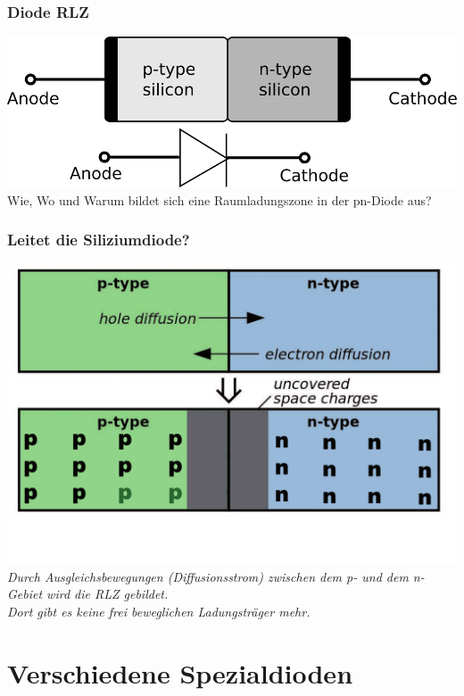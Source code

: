 \begin{frame}
    \frametitle{Diode RLZ}
    \begin{center}
        \includegraphics[width=1\textwidth]{a05/diode_with_electrical_symbol.png}
        \tiny \hyperlink{refs}{\cite{wm}} \\[3em]
     \large Wie, Wo und Warum bildet sich eine Raumladungszone in der pn-Diode aus?
     \end{center}
\end{frame}

\begin{frame}
    \frametitle{Leitet die Siliziumdiode?}
    \begin{center}
        \includegraphics[width=1\textwidth]{a05/Pn_Junction_Diffusion_and_Drift.pdf}\\
     \emph{Durch Ausgleichsbewegungen (Diffusionsstrom) zwischen dem p- und dem n-Gebiet wird die RLZ gebildet.\\
     		Dort gibt es keine frei beweglichen Ladungsträger mehr.}\
     \end{center}
\end{frame}
  
\section*{Verschiedene Spezialdioden}

